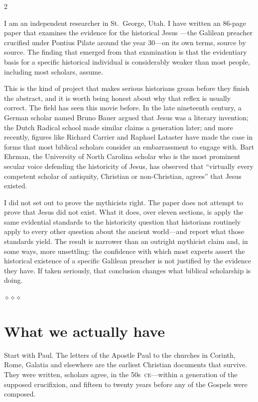 \documentclass[11pt,oneside]{article}
\newcommand{\sectbreak}{%
  \par\vspace{1.3em}
  \noindent\hfil
  {\color{accent}$\diamond$\hspace{0.5em}$\diamond$\hspace{0.5em}$\diamond$}%
  \hfil\par\vspace{1em}}
\begin{document}
\begin{multicols}{2}

\lettrine[lines=3,findent=2pt,nindent=0pt,loversize=0.15]{I}{} am an
independent researcher in St.\ George, Utah.  I have written an
86-page paper that examines the evidence for the historical Jesus
---the Galilean preacher crucified under Pontius Pilate around the
year 30---on its own terms, source by source.  The finding that
emerged from that examination is that the evidentiary basis for
a specific historical individual is considerably weaker than most
people, including most scholars, assume.

This is the kind of project that makes serious historians groan
before they finish the abstract, and it is worth being honest about
why that reflex is usually correct.  The field has seen this movie
before.  In the late nineteenth century, a German scholar named
Bruno Bauer argued that Jesus was a literary invention; the Dutch
Radical school made similar claims a generation later; and more
recently, figures like Richard Carrier and Raphael Lataster have
made the case in forms that most biblical scholars consider an
embarrassment to engage with.  Bart Ehrman, the University of North
Carolina scholar who is the most prominent secular voice defending
the historicity of Jesus, has observed that \enquote{virtually every
competent scholar of antiquity, Christian or non-Christian, agrees}
that Jesus existed.

I did not set out to prove the mythicists right.  The paper does
not attempt to prove that Jesus did not exist.  What it does, over
eleven sections, is apply the same evidential standards to the
historicity question that historians routinely apply to every other
question about the ancient world---and report what those standards
yield.  The result is narrower than an outright mythicist claim and,
in some ways, more unsettling: the confidence with which most
experts assert the historical existence of a specific Galilean
preacher is not justified by the evidence they have.  If taken
seriously, that conclusion changes what biblical scholarship is
doing.

\sectbreak
\section*{What we actually have}

Start with Paul.  The letters of the Apostle Paul to the churches
in Corinth, Rome, Galatia and elsewhere are the earliest Christian
documents that survive.  They were written, scholars agree, in the
50s~\textsc{ce}---within a generation of the supposed crucifixion,
and fifteen to twenty years before any of the Gospels were composed.


\end{multicols}
\end{document}

